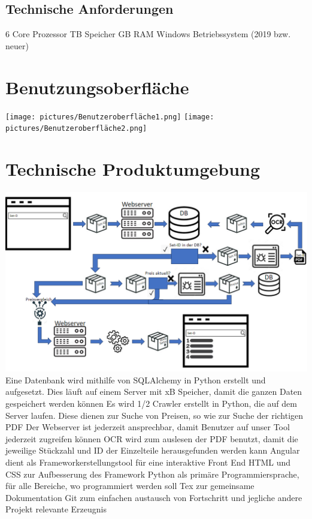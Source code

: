 \subsection{Technische Anforderungen}
6 Core Prozessor  TB Speicher  GB RAM \newline
Windows Betriebssystem (2019 bzw. neuer) \newline

\section{Benutzungsoberfläche}
\texttt{[image: pictures/Benutzeroberfläche1.png]} \newline \newline
\texttt{[image: pictures/Benutzeroberfläche2.png]}

\section{Technische Produktumgebung}
\includegraphics[width=18cm]{pictures/systemdurchlauf.png} \newline
Eine Datenbank wird mithilfe von SQLAlchemy in Python erstellt und aufgesetzt. Dies läuft auf einem Server mit xB Speicher, damit die ganzen Daten gespeichert werden können \newline
Es wird 1/2 Crawler erstellt in Python, die auf dem Server laufen. Diese dienen zur Suche von Preisen, so wie zur Suche der richtigen PDF \newline
Der Webserver ist jederzeit ansprechbar, damit Benutzer auf unser Tool jederzeit zugreifen können
OCR wird zum auslesen der PDF benutzt, damit die jeweilige Stückzahl und ID der Einzelteile herausgefunden werden kann \newline
Angular dient als Frameworkerstellungstool für eine interaktive Front End \newline
HTML und CSS zur Aufbesserung des Framework \newline
Python als primäre Programmiersprache, für alle Bereiche, wo programmiert werden soll \newline
Tex zur gemeinsame Dokumentation \newline
Git zum einfachen austausch von Fortschritt und jegliche andere Projekt relevante Erzeugnis \newline

